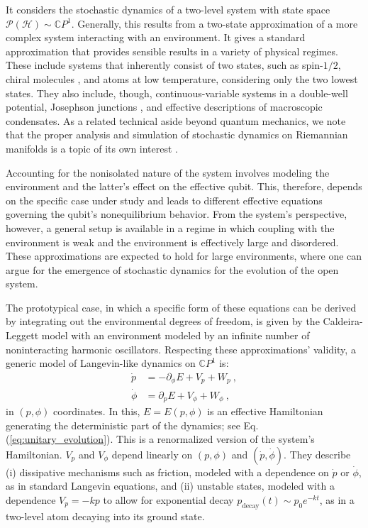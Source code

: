 \documentclass[draft,nofootinbib,pre,twocolumn,showpacs,showkeys,groupaddress,preprintnumbers,floatfix]{revtex4-1}
\newcommand{\1}{\mathbbm{1}}
\newcommand{\PH}{\mathcal{P}(\mathcal{H})}
\begin{document}
It considers the stochastic dynamics of a two-level system with state space
$\PH \sim \mathbb{C}P^{1}$. Generally, this results from a two-state
approximation of a more complex system interacting with an environment. It
gives a standard approximation that provides sensible results in a variety of
physical regimes. These include systems that inherently consist of two states,
such as spin-$1/2$, chiral molecules
\cite{Urra12,Barg11,Rod14,Rod13,Barg13,Barg14,Katz16}, and atoms at low
temperature, considering only the two lowest states.  They also include,
though, continuous-variable systems in a double-well potential, Josephson
junctions \cite{Feyn63c}, and effective descriptions of macroscopic
condensates. As a related technical aside beyond quantum mechanics, we note
that the proper analysis and simulation of stochastic dynamics on Riemannian
manifolds is a topic of its own interest \cite{Gom21,Rob60}.

Accounting for the nonisolated nature of the system involves modeling the
environment and the latter's effect on the effective qubit. This, therefore,
depends on the specific case under study and leads to different effective
equations governing the qubit's nonequilibrium behavior. From the system's
perspective, however, a general setup is available in a regime in which
coupling with the environment is weak and the environment is effectively large
and disordered. These approximations are expected to hold for large
environments, where one can argue for the emergence of stochastic dynamics for
the evolution of the open system.

The prototypical case, in which a specific form of these equations can be
derived by integrating out the environmental degrees of freedom, is given by
the Caldeira-Leggett model \cite{Cald83,Cald83b,Legg87} with an environment
modeled by an infinite number of noninteracting harmonic oscillators.
Respecting these approximations' validity, a generic model of Langevin-like
dynamics on $\mathbb{C}P^1$ is:
\begin{align}
\dot{p} & = -\partial_\phi E + V_p + W_p~,\\
\dot{\phi} & =  \partial_p E + V_\phi + W_{\phi}
  ~, \nonumber
\end{align}
in $(p,\phi)$ coordinates. In this, $E=E(p,\phi)$ is an effective Hamiltonian
generating the deterministic part of the dynamics; see Eq.
(\ref{eq:unitary_evolution}). This is a renormalized version of the system's
Hamiltonian. $V_{p}$ and $V_{\phi}$ depend linearly on $(p,\phi)$ and
$(\dot{p},\dot{\phi})$. They describe (i) dissipative mechanisms such as
friction, modeled with a dependence on $\dot{p}$ or $\dot{\phi}$, as in
standard Langevin equations, and (ii) unstable states, modeled with a
dependence $V_p = -kp$ to allow for exponential decay $p_{\mathrm{decay}}(t)
\sim p_0e^{-kt}$, as in a two-level atom decaying into its ground state.
\end{document}
